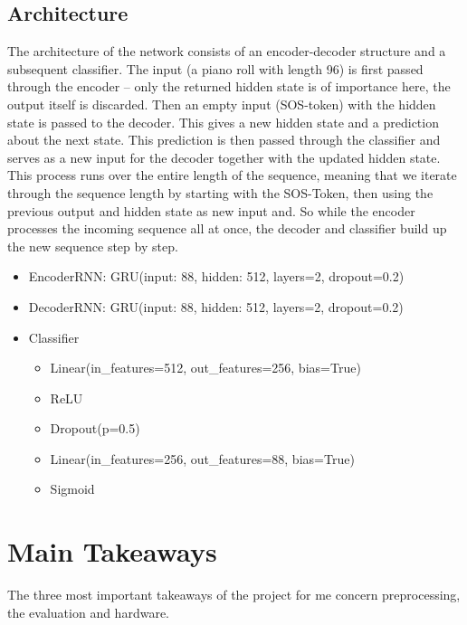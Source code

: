\documentclass[a4paper, 10pt, xcolor=dvipsnames]{article} %
\begin{document}
\subsection{Architecture}

The architecture of the network consists of an encoder-decoder structure and a
subsequent classifier. The input (a piano roll with length 96) is first passed
through the encoder -- only the returned hidden state is of importance here,
the output itself is discarded. Then an empty input (SOS-token) with the hidden
state is passed to the decoder. This gives a new hidden state and a prediction
about the next state. This prediction is then passed through the classifier and
serves as a new input for the decoder together with the updated hidden state.
This process runs over the entire length of the sequence, meaning that we
iterate through the sequence length by starting with the SOS-Token, then using
the previous output and hidden state as new input and. So while the encoder
processes the incoming sequence all at once, the decoder and classifier build
up the new sequence step by step.

\begin{itemize}
  \item EncoderRNN: GRU(input: 88, hidden: 512, layers=2, dropout=0.2)
  \item DecoderRNN: GRU(input: 88, hidden: 512, layers=2, dropout=0.2)
  \item Classifier
        \begin{itemize}
          \item  Linear(in\_features=512, out\_features=256, bias=True)
          \item  ReLU
          \item  Dropout(p=0.5)
          \item  Linear(in\_features=256, out\_features=88, bias=True)
          \item  Sigmoid
        \end{itemize}
\end{itemize}

\section{Main Takeaways}

The three most important takeaways of the project for me concern preprocessing,
the evaluation and hardware.
\end{document}
